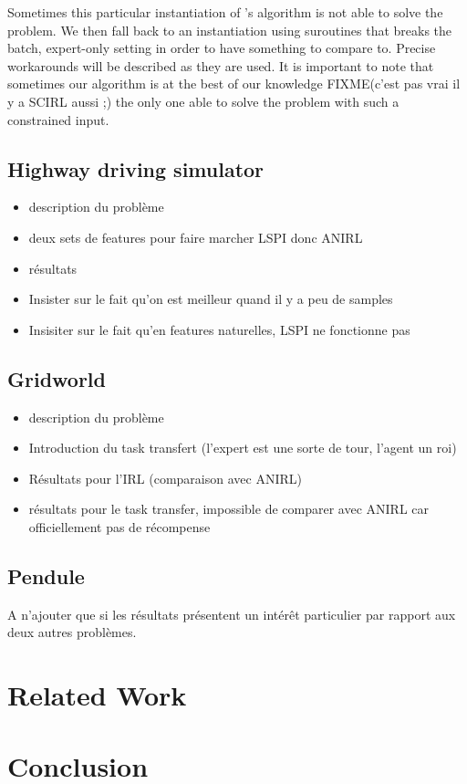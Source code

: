 \documentclass{llncs}
\newcommand{\0}{\mathbf{0}}
\newcommand{\1}{\mathbf{1}}
\begin{document}
Sometimes this particular instantiation of \cite{abbeel2004apprenticeship}'s algorithm is not able to solve the problem. We then fall back to an instantiation using suroutines that breaks the batch, expert-only setting in order to have something to compare to. Precise workarounds will be described as they are used. It is important to note that sometimes our algorithm is at the best of our knowledge FIXME(c'est pas vrai il y a SCIRL aussi ;) the only one able to solve the problem with such a constrained input.
\subsection{Highway driving simulator}
\begin{itemize}
\item description du problème
\item deux sets de features pour faire marcher LSPI donc ANIRL
\item résultats
\item Insister sur le fait qu'on est meilleur quand il y a peu de samples
\item Insisiter sur le fait qu'en features naturelles, LSPI ne fonctionne pas
\end{itemize}
\subsection{Gridworld}
\begin{itemize}
\item description du problème
\item Introduction du task transfert (l'expert est une sorte de tour, l'agent un roi)
\item Résultats pour l'IRL (comparaison avec ANIRL)
\item résultats pour le task transfer, impossible de comparer avec ANIRL car officiellement pas de récompense
\end{itemize}
\subsection{Pendule}
A n'ajouter que si les résultats présentent un intérêt particulier par rapport aux deux autres problèmes.
\section{Related Work}
\label{section: related work}

\section{Conclusion}



\end{document}
